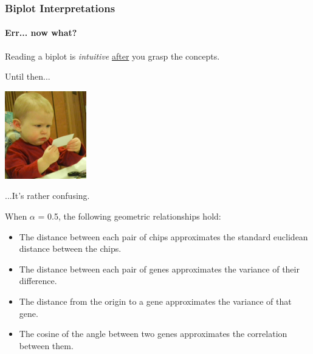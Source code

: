 \documentclass[serif]{beamer}
\begin{document}
	\begin{frame}[t]
		\frametitle{Biplot Interpretations}
		\framesubtitle{Err... now what?}
	
		{
		\large
		\begin{block}{\vspace{-0.5in}}
			Reading a biplot is \emph{intuitive} \underline{after} you grasp the concepts. 	
		\end{block}
		\raggedright Until then...
		\begin{center}
			\includegraphics[height=1.5in]{images/confused}	
		\end{center}
		\raggedleft ...It's rather confusing.
		}
		{
			\begin{block}{\vspace{-0.5in}}
				When $\alpha$ = 0.5, the following geometric relationships hold:
			\end{block}
			\begin{itemize}
				\item The distance between each pair of chips 
approximates the standard euclidean distance 
between the chips.
				\item The distance between each pair of genes 
approximates the variance of their difference.
				\item The distance from the origin to a gene 
approximates the variance of that gene.
				\item The cosine of the angle between two genes 
approximates the correlation between them.
			\end{itemize}
		}
		

\end{frame}
\end{document}
